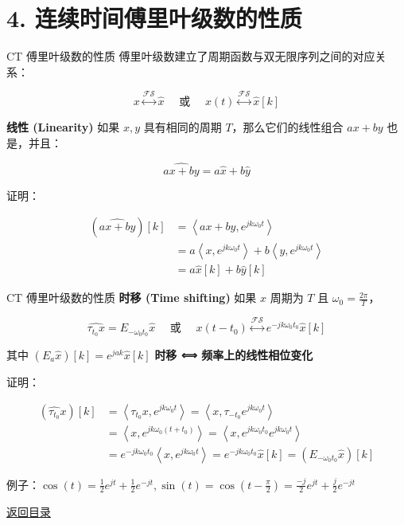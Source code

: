 \documentclass[
  ignorenonframetext,
]{beamer}
\begin{document}
\section{4. 连续时间傅里叶级数的性质}\label{sec34}

\begin{frame}{CT 傅里叶级数的性质}
\protect{}\label{ct-ux5085ux91ccux53f6ux7ea7ux6570ux7684ux6027ux8d28}
傅里叶级数建立了周期函数与双无限序列之间的对应关系：

\[
x \stackrel{\mathcal{F S}}{\longleftrightarrow} \hat{x} \quad \text { 或 } \quad x(t) \stackrel{\mathcal{F S}}{\longleftrightarrow} \hat{x}[k]
\]

\textbf{线性 (Linearity)} 如果 \(x, y\) 具有相同的周期
\(T\)，那么它们的线性组合 \(a x+b y\) 也是，并且：

\[
\widehat{a x+b y}=a \hat{x}+b \hat{y}
\]

证明：

\[
\begin{aligned}
(\widehat{a x+b y})[k] & =\left\langle a x+b y, e^{j k \omega_{0} t}\right\rangle \\
& =a\left\langle x, e^{j k \omega_{0} t}\right\rangle+b\left\langle y, e^{j k \omega_{0} t}\right\rangle \\
& =a \hat{x}[k]+b \hat{y}[k]
\end{aligned}
\]
\end{frame}

\begin{frame}{CT 傅里叶级数的性质}
\protect{}\label{ct-ux5085ux91ccux53f6ux7ea7ux6570ux7684ux6027ux8d28-1}
\textbf{时移 (Time shifting)} 如果 \(x\) 周期为 \(T\) 且
\(\omega_{0}=\frac{2 \pi}{T}\)，

\[
\widehat{\tau_{t_{0}} x}=E_{-\omega_{0} t_{0}} \hat{x} \quad \text { 或 } \quad x\left(t-t_{0}\right) \stackrel{\mathcal{F S}}{\longleftrightarrow} e^{-j k \omega_{0} t_{0}} \hat{x}[k]
\]

其中 \(\left(E_{a} \hat{x}\right)[k]=e^{j a k} \hat{x}[k]\) \textbf{时移
⟺ 频率上的线性相位变化}

证明：

\[
\begin{aligned}
\left(\widehat{\tau_{t_{0}}} x\right)[k] & =\left\langle\tau_{t_{0}} x, e^{j k \omega_{0} t}\right\rangle=\left\langle x, \tau_{-t_{0}} e^{j k \omega_{0} t}\right\rangle \\
& =\left\langle x, e^{j k \omega_{0}\left(t+t_{0}\right)}\right\rangle=\left\langle x, e^{j k \omega_{0} t_{0}} e^{j k \omega_{0} t}\right\rangle \\
& =e^{-j k \omega_{0} t_{0}}\left\langle x, e^{j k \omega_{0} t}\right\rangle=e^{-j k \omega_{0} t_{0}} \hat{x}[k]=\left(E_{-\omega_{0} t_{0}} \hat{x}\right)[k]
\end{aligned}
\]

例子：\(\cos (t)=\frac{1}{2} e^{j t}+\frac{1}{2} e^{-j t}, \sin (t)=\cos \left(t-\frac{\pi}{2}\right)=\frac{-j}{2} e^{j t}+\frac{j}{2} e^{-j t}\)

\hyperlink{toc4}{返回目录}
\end{frame}
\end{document}
